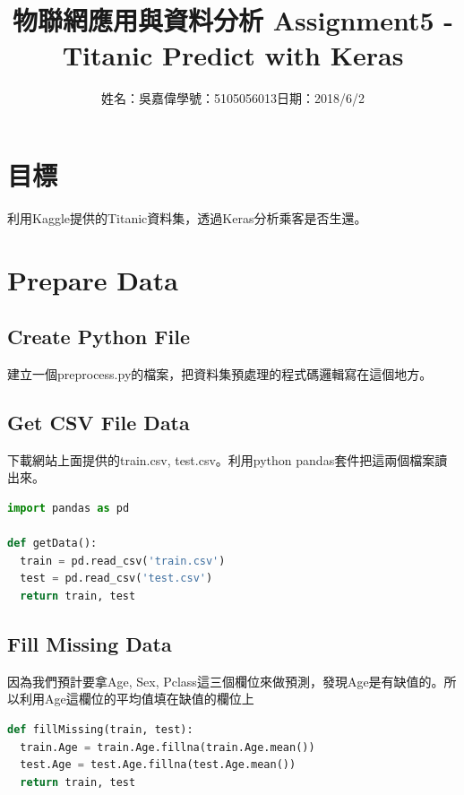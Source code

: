 \documentclass[12pt,a4paper]{article}
\title{\huge 物聯網應用與資料分析 Assignment5 - Titanic Predict with Keras} %
\author{姓名：吳嘉偉\quad 學號：5105056013\quad 日期：2018/6/2} %
\date{} %
\begin{document}
\clearpage

\maketitle %

\section{目標}
{
\fontsize{14pt}{10pt} %
\selectfont %
利用Kaggle提供的Titanic資料集，透過Keras分析乘客是否生還。

\section{Prepare Data}
{
\subsection{Create Python File}
建立一個preprocess.py的檔案，把資料集預處理的程式碼邏輯寫在這個地方。

\subsection{Get CSV File Data}
下載網站上面提供的train.csv, test.csv。利用python pandas套件把這兩個檔案讀出來。

\begin{shaded}
\begin{lstlisting}[language=Python]
import pandas as pd

def getData():
  train = pd.read_csv('train.csv')
  test = pd.read_csv('test.csv')
  return train, test

\end{lstlisting}
\end{shaded}

\subsection{Fill Missing Data}
因為我們預計要拿Age, Sex, Pclass這三個欄位來做預測，發現Age是有缺值的。所以利用Age這欄位的平均值填在缺值的欄位上

\begin{shaded}
\begin{lstlisting}[language=Python]
def fillMissing(train, test):
  train.Age = train.Age.fillna(train.Age.mean())
  test.Age = test.Age.fillna(test.Age.mean())
  return train, test
\end{lstlisting}
\end{shaded}

}}
\end{document}
